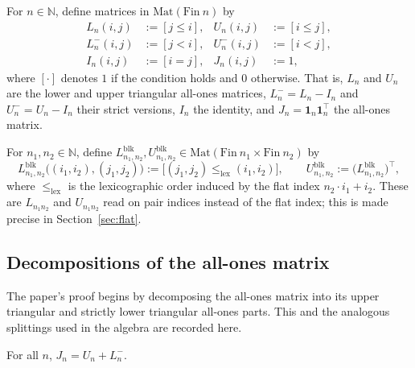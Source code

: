 \begin{definition}
  \label{def:triangular}
  \leanok
  For $n \in \mathbb{N}$, define matrices in $\mathrm{Mat}(\mathrm{Fin}\ n)$ by
  \begin{align*}
    L_n(i,j) &:= [j \le i], & U_n(i,j) &:= [i \le j], \\
    L^-_n(i,j) &:= [j < i], & U^-_n(i,j) &:= [i < j], \\
    I_n(i,j) &:= [i = j], & J_n(i,j) &:= 1,
  \end{align*}
  where $[\cdot]$ denotes $1$ if the condition holds and $0$ otherwise.
  That is, $L_n$ and $U_n$ are the lower and upper triangular all-ones
  matrices, $L^-_n = L_n - I_n$ and $U^-_n = U_n - I_n$ their strict
  versions, $I_n$ the identity, and $J_n = \mathbf 1_n \mathbf 1_n^\top$
  the all-ones matrix.
\end{definition}

\begin{definition}
  \label{def:block}
  \leanok
  For $n_1, n_2 \in \mathbb{N}$, define $L^{\mathrm{blk}}_{n_1,n_2},
  U^{\mathrm{blk}}_{n_1,n_2} \in \mathrm{Mat}(\mathrm{Fin}\ n_1 \times
  \mathrm{Fin}\ n_2)$ by
  \[
    L^{\mathrm{blk}}_{n_1,n_2}\big((i_1,i_2),(j_1,j_2)\big) :=
      \big[(j_1,j_2) \le_{\mathrm{lex}} (i_1,i_2)\big], \qquad
    U^{\mathrm{blk}}_{n_1,n_2} := \big(L^{\mathrm{blk}}_{n_1,n_2}\big)^\top,
  \]
  where $\le_{\mathrm{lex}}$ is the lexicographic order induced by the flat
  index $n_2 \cdot i_1 + i_2$. These are $L_{n_1 n_2}$ and $U_{n_1 n_2}$
  read on pair indices instead of the flat index; this is made precise in
  Section~\ref{sec:flat}.
\end{definition}

\subsection{Decompositions of the all-ones matrix}

The paper's proof begins by decomposing the all-ones matrix into its
upper triangular and strictly lower triangular all-ones parts. This and
the analogous splittings used in the algebra are recorded here.

\begin{lemma}
  \label{lem:J_eq_U_add_Lm}
  \leanok
  For all $n$, $J_n = U_n + L^-_n$.
\end{lemma}

